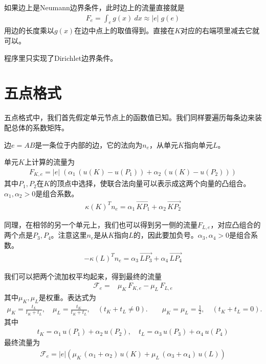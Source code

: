 \documentclass[12pt,a4paper]{article}
\begin{document}
如果边上是Neumann边界条件，此时边上的流量直接就是
\begin{align*}
F_{e} = \int_{e} g(x) \ dx \approx |e| \; g(e)
\end{align*}
用边的长度乘以$g(x)$在边中点上的取值得到。直接在$K$对应的右端项里减去它就可以。

程序里只实现了Dirichlet边界条件。

\section*{五点格式}

五点格式中，我们首先假定单元节点上的函数值已知。我们同样要遍历每条边来装配总体的系数矩阵。

边$e = AB$是一条位于内部的边，它的法向为$n_e$，从单元$K$指向单元$L$。

单元$K$上计算的流量为
\begin{align*}
F_{K, e} = |e| \; (\alpha_1 \, (u(K) - u(P_1)) + \alpha_2 \, (u(K) - u(P_2)))
\end{align*}
其中$P_1, P_2$在$K$的顶点中选择，使联合法向量可以表示成这两个向量的凸组合。$\alpha_1, \alpha_2 > 0$是组合系数。
\begin{align*}
\kappa(K)^T n_{e} = \alpha_1 \, \overrightarrow{K P_1} + \alpha_2 \, \overrightarrow{K P_2}
\end{align*}

同理，在相邻的另一个单元上，我们也可以得到另一侧的流量$F_{L, e}$，对应凸组合的两个点是$P_3, P_4$。注意这里$n_{e}$是从$K$指向$L$的，因此要加负号。$\alpha_3, \alpha_4 > 0$是组合系数。
\begin{align*}
- \kappa(L)^T n_{e} = \alpha_3 \, \overrightarrow{L P_3} + \alpha_4 \, \overrightarrow{L P_4}
\end{align*}

我们可以把两个流加权平均起来，得到最终的流量
\begin{align*}
\mathcal{F}_{e} = & \mu_K \, F_{K, e} - \mu_L \, F_{L, e} 
\end{align*}
其中$\mu_K, \mu_L$是权重。表达式为
\begin{align*}
\mu_K = \frac{t_L}{t_K + t_L}, \quad \mu_L = \frac{t_K}{t_K + t_L}, \quad (t_K + t_L \neq 0). \qquad \mu_K = \mu_L = \frac12, \quad (t_K + t_L = 0).
\end{align*}
其中
\begin{align*}
t_K = \alpha_1 \, u(P_1) + \alpha_2 \, u(P_2), \quad t_L = \alpha_3 \, u(P_3) + \alpha_4 \, u(P_4)
\end{align*}
最终流量为
\begin{align*}
\mathcal{F}_{e} = |e| \left(\mu_K \, (\alpha_1 + \alpha_2) \, u(K) + \mu_L \, (\alpha_3 + \alpha_4) \, u(L) \right)
\end{align*}
\end{document}
